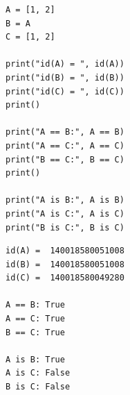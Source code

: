 \begin{frame}[fragile]
%
\begin{tcbraster}[raster columns=2,
                  raster equal height,
                  nobeforeafter,
                  raster column skip=0.2cm]
\begin{codebox}
\begin{verbatim}
A = [1, 2]
B = A
C = [1, 2]

print("id(A) = ", id(A))
print("id(B) = ", id(B))
print("id(C) = ", id(C))
print()

print("A == B:", A == B)
print("A == C:", A == C)
print("B == C:", B == C)
print()

print("A is B:", A is B)
print("A is C:", A is C)
print("B is C:", B is C)
\end{verbatim}
\end{codebox}
%
\begin{cmdbox}[Output]
\begin{verbatim}
id(A) =  140018580051008
id(B) =  140018580051008
id(C) =  140018580049280

A == B: True
A == C: True
B == C: True

A is B: True
A is C: False
B is C: False
\end{verbatim}
\end{cmdbox}
\end{tcbraster}
%
\end{frame}


